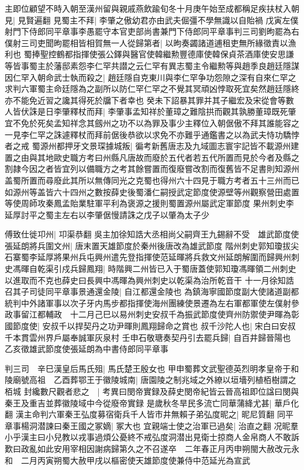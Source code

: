主即位顧望不時入朝至漢州留與親戚燕飲踰旬冬十月庚午始至成都稱足疾扶杖入朝見|{
	見賢遍翻}
見蜀主不拜|{
	李肇之傲幼君亦由武夫倔彊不學無識以自貽禍}
戊寅左僕射門下侍郎同平章事李愚罷守本官吏部尚書兼門下侍郎同平章事判三司劉昫罷為右僕射三司吏聞昫罷相皆相賀無一人從歸第者|{
	以昫奏蠲諸道逋租吏無所緣徵責以漁利也}
蜀捧聖控鶴都指揮使張公鐸與醫官使韓繼勲豐德庫使韓保貞茶酒庫使安思謙等皆事蜀主於藩邸素怨李仁罕共譛之云仁罕有異志蜀主令繼勲等與趙季良趙廷隱謀因仁罕入朝命武士執而殺之|{
	趙廷隱自克東川與李仁罕争功怨隙之深有自來仁罕之求判六軍蜀主命廷隱為之副所以防仁罕仁罕之不覺其冥頑凶悖取死宜矣然趙廷隱終亦不能免近習之讒其得死於牖下者幸也}
癸未下詔暴其罪并其子繼宏及宋從會等數人皆伏誅是日李肇釋杖而拜|{
	李肇事孟知祥於董璋之難陰拱而觀其孰勝董璋既死肇宜不免於死矣孟知祥念其劔州之功不以為罪及事少主釋位入朝倨傲不拜其誰能容之一見李仁罕之誅遽釋杖而拜前倨後恭欲以求免不亦難乎通鑑書之以為武夫恃功驕悖者之戒}
蜀源州都押牙文景琛據城叛|{
	徧考新舊唐志及九域圖志寰宇記皆不載源州建置之由與其地歐史職方考曰州縣凡唐故而廢於五代者若五代所置而見於今者及縣之割隷今因之者皆宜列以備職方之考其餘嘗置而復廢嘗改割而復舊皆不足書則知源州盖蜀所置而尋廢此其所以無傳同光之克蜀也得州六十四見于職方考者五十三州而已如源州等盖皆六十四州之數按薛史後蜀潘仁嗣授武定節度使源壁等州觀察營田處置等使周師攻秦鳳孟貽業駐軍平利為褒源之援則蜀置源州屬武定軍節度}
果州刺史李延厚討平之蜀主左右以李肇倨慢請誅之戊子以肇為太子少

傅致仕徙卭州|{
	卭渠恭翻}
吳主加徐知誥大丞相尚父嗣齊王九錫辭不受　雄武節度使張延朗將兵圍文州|{
	唐末置天雄節度於秦州後唐改為雄武節度}
階州刺史郭知瓊拔尖石寨蜀李延厚將果州兵屯興州遣先登指揮使范延暉將兵救文州延朗解圍而歸興州刺史馮暉自乾渠引戍兵歸鳳翔|{
	時階興二州皆已入于蜀唐蓋使郭知瓊馮暉領二州刺史以進取而不克也薛史曰長興中馮暉為興州刺史以乾渠為治所乾音干}
十一月徐知誥召其子司徒同平章事景通還金陵|{
	自江都還金陵也}
為鎮海寧國節度副大使諸道副都統判中外諸軍事以次子牙内馬步都指揮使海州團練使景遷為左右軍都軍使左僕射參政事留江都輔政　十二月己巳以易州刺史安叔千為振武節度使齊州防禦使尹暉為彰國節度使|{
	安叔千以捍契丹之功尹暉則鳳翔歸命之賞也}
叔千沙陀人也|{
	宋白曰安叔千本貫雲州界戶屬奉誠軍灰泉村}
壬申石敬瑭奏契丹引去罷兵歸|{
	自百井歸晉陽也}
乙亥徵雄武節度使張延朗為中書侍郎同平章事

判三司　辛巳漢皇后馬氏殂|{
	馬氏楚王殷女也}
甲申蜀葬文武聖德英烈明孝皇帝于和陵廟號高祖　乙酉葬鄂王于徽陵城南|{
	唐園陵之制兆域之外繚以垣墻列植栢樹謂之栢城}
封纔數尺觀者悲之　|{
	考異曰閔帝實録及薛史閔帝紀皆云晉高祖即位諡曰閔與秦王及重吉並葬徽陵域中今從廢帝實録}
是歲秋冬旱民多流亡同華蒲絳尤甚|{
	華戶化翻}
漢主命判六軍秦王弘度募宿衛兵千人皆市井無賴子弟弘度昵之|{
	昵尼質翻}
同平章事楊洞潜諫曰秦王國之冢嫡|{
	冢大也}
宜親端士使之治軍已過矣|{
	治直之翻}
况昵羣小乎漢主曰小兒教以戎事過煩公憂終不戒弘度洞潜出見衛士掠商人金帛商人不敢訴歎曰政亂如此安用宰相因謝病歸第久之不召遂卒　二年春正月丙申朔閩大赦改元永和　二月丙寅朔蜀大赦甲戌以樞密使天雄節度使兼侍中范延光為宣武

